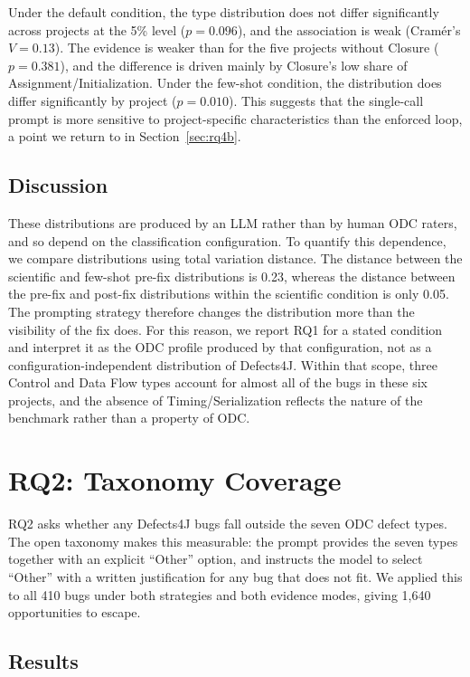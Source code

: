 \documentclass{iutbscthesis}
\begin{document}
Under the default condition, the type distribution does not differ significantly across projects at the 5\% level ($p = 0.096$), and the association is weak (Cram\'er's $V = 0.13$). The evidence is weaker than for the five projects without Closure ($p = 0.381$), and the difference is driven mainly by Closure's low share of Assignment/\allowbreak Initialization. Under the few-shot condition, the distribution does differ significantly by project ($p = 0.010$). This suggests that the single-call prompt is more sensitive to project-specific characteristics than the enforced loop, a point we return to in Section~\ref{sec:rq4b}.

\subsection{Discussion}

These distributions are produced by an LLM rather than by human ODC raters, and so depend on the classification configuration. To quantify this dependence, we compare distributions using total variation distance. The distance between the scientific and few-shot pre-fix distributions is 0.23, whereas the distance between the pre-fix and post-fix distributions within the scientific condition is only 0.05. The prompting strategy therefore changes the distribution more than the visibility of the fix does. For this reason, we report RQ1 for a stated condition and interpret it as the ODC profile produced by that configuration, not as a configuration-independent distribution of Defects4J. Within that scope, three Control and Data Flow types account for almost all of the bugs in these six projects, and the absence of Timing/\allowbreak Serialization reflects the nature of the benchmark rather than a property of ODC.

\section{RQ2: Taxonomy Coverage}
\label{sec:rq2}

RQ2 asks whether any Defects4J bugs fall outside the seven ODC defect types. The open taxonomy makes this measurable: the prompt provides the seven types together with an explicit ``Other'' option, and instructs the model to select ``Other'' with a written justification for any bug that does not fit. We applied this to all 410 bugs under both strategies and both evidence modes, giving 1{,}640 opportunities to escape.

\subsection{Results}
\end{document}
